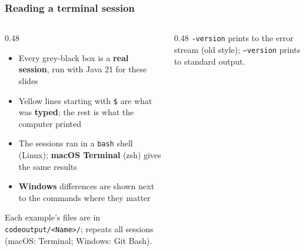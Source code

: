 \documentclass[aspectratio=169,10pt,compress]{beamer}
\begin{document}
\begin{frame}[t,fragile] \frametitle{Reading a terminal session}
  \begin{columns}[T]
    \begin{column}{0.48\textwidth}
      \begin{itemize}\small
        \item Every grey-black box is a \textbf{real session}, run with Java 21 for these slides
        \item Yellow lines starting with \texttt{\$} are what was \textbf{typed}; the rest is what the computer printed
        \item The sessions ran in a \texttt{bash} shell (Linux); \textbf{macOS Terminal} (zsh) gives the same results
        \item \textbf{Windows} differences are shown next to the commands where they matter
      \end{itemize}
      \vspace{0.3em}
      \small Each example's files are in \texttt{codeoutput/<Name>/};  repeats all sessions
      (macOS: Terminal; Windows: Git Bash).
    \end{column}
    \begin{column}{0.48\textwidth}
      \small \texttt{-version} prints to the error stream (old style); \texttt{--version} prints to standard output.
    \end{column}
  \end{columns}
\end{frame}
\end{document}
